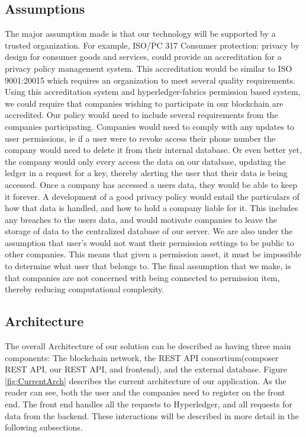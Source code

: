 \documentclass[11pt,journal]{IEEEtran}
\begin{document}
\subsection{Assumptions} \label{sec:assumptions}
The major assumption made is that our technology will be supported by a trusted organization.  For example, ISO/PC 317 \cite{ISOPC31742:online} Consumer protection: privacy by design for consumer goods and services, could provide an accreditation for a privacy policy management system.  This accreditation would be similar to ISO 9001:20015 \cite{ISO9001228:online} which requires an organization to meet several quality requirements.  Using this accreditation system and hyperledger-fabrics permission based system, we could require that companies wishing to participate in our blockchain are accredited.  Our policy would need to include several requirements from the companies participating.  Companies would need to comply with any updates to user permissions, ie if a user were to revoke access their phone number the company would need to delete it from their internal database.  Or even better yet, the company would only every access the data on our database, updating the ledger in a request for a key, thereby alerting the user that their data is being accessed.  Once a company has accessed a users data, they would be able to keep it forever.  A development of a good privacy policy would entail the particulars of how that data is handled, and how to hold a company liable for it.  This includes any breaches to the users data, and would motivate companies to leave the storage of data to the centralized database of our server.  We are also under the assumption that user’s would not want their permission settings to be public to other companies.  This means that given a permission asset, it must be impossible to determine what user that belongs to.  The final assumption that we make, is that companies are not concerned with being connected to permission item, thereby reducing computational complexity.

\subsection{Architecture} \label{sec:arch}

The overall Architecture of our solution can be described as having three main components: The blockchain network, the REST API consortium(composer REST API, our REST API, and frontend), and the external database.  Figure \ref{fig:CurrentArch} describes the  current architecture of our application.  As the reader can see, both the user and the companies need to register on the front end.  The front end handles all the requests to Hyperledger, and all requests for data from the backend.  These interactions will be described in more detail in the following subsections.
\end{document}
